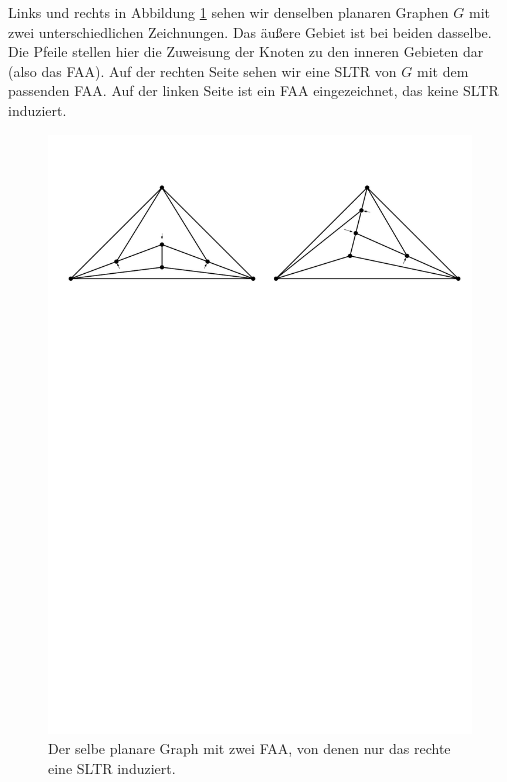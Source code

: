 \begin{example}\label{bsp_faa}
Links und rechts in Abbildung \ref{exp_faa} sehen wir denselben planaren Graphen $G$ mit zwei unterschiedlichen Zeichnungen. Das äußere Gebiet ist bei beiden dasselbe. Die Pfeile stellen hier die Zuweisung der Knoten zu den inneren Gebieten dar (also das FAA). Auf der rechten Seite sehen wir eine SLTR von $G$ mit dem passenden FAA. Auf der linken Seite ist ein FAA eingezeichnet, das keine SLTR induziert.

\begin{figure}[h]
	\centering
  \includegraphics[width=1\textwidth]{faa_def.pdf}
  \caption{Der selbe planare Graph mit zwei FAA, von denen nur das rechte eine SLTR induziert.}
  \label{exp_faa}
\end{figure}
\end{example}

